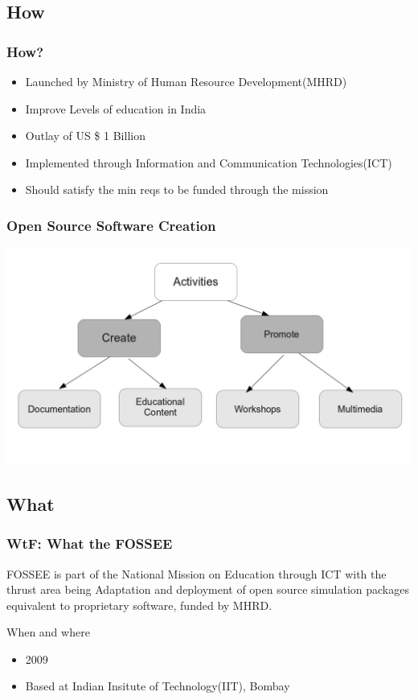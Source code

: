 \documentclass[compress,red]{beamer} %
\begin{document}
\subsection{How}
\begin{frame}
\frametitle{How?}
\begin{itemize}
\item Launched by Ministry of Human Resource Development(MHRD)
\item Improve Levels of education in India
\item Outlay of US \$ 1 Billion
\item Implemented through Information and Communication Technologies(ICT)
\item Should satisfy the min reqs to be funded through the mission
\end{itemize}
\end{frame}


\begin{frame}
\frametitle{Open Source Software Creation}
\includegraphics[scale=.30]{tree.png}
\end{frame}

\subsection{What}
\begin{frame}
\frametitle{WtF: What the FOSSEE}
\begin{block}{FOSSEE}
is  part of the National Mission on Education through ICT with the thrust area being \alert{Adaptation and deployment of open source simulation packages equivalent to proprietary software}, funded by MHRD.
\end{block}
\begin{block}{When and where}
\begin{itemize}
\item 2009
\item Based at Indian Insitute of Technology(IIT), Bombay 
\end{itemize}
\end{block}
\end{frame}
\end{document}
